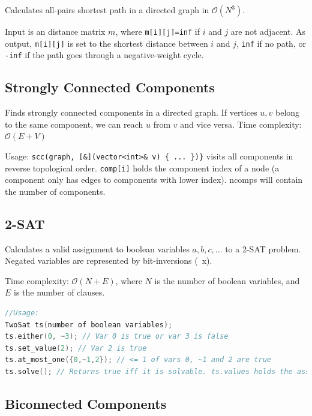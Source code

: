 \documentclass{article}
\begin{document}
Calculates all-pairs shortest path in a directed graph in $\mathcal{O}(N^3)$.

Input is an distance matrix $m$, where \lstinline{m[i][j]=inf} if $i$ and $j$ are not adjacent.
As output, \lstinline{m[i][j]} is set to the shortest distance between $i$ and $j$,
\lstinline{inf} if no path, or \lstinline{-inf} if the path goes through a negative-weight cycle.




\subsection*{Strongly Connected Components}

Finds strongly connected components in a directed graph. If vertices $u, v$ belong to the same component, we can reach $u$ from $v$ and vice versa.
Time complexity: $\mathcal{O}(E + V)$

Usage: \lstinline|scc(graph, [&](vector<int>& v) { ... })}| visits all components
in reverse topological order. \texttt{comp[i]} holds the component
index of a node (a component only has edges to components with
lower index). ncomps will contain the number of components.



\pagebreak

\subsection*{2-SAT}

Calculates a valid assignment to boolean variables $a, b, c,\ldots$ to a 2-SAT problem.
Negated variables are represented by bit-inversions (~x).

Time complexity: $\mathcal{O}(N+E)$, where $N$ is the number of boolean variables, and $E$ is the number of clauses.


\begin{lstlisting}[language=C++, aboveskip=0pt]
//Usage:
TwoSat ts(number of boolean variables);
ts.either(0, ~3); // Var 0 is true or var 3 is false
ts.set_value(2); // Var 2 is true
ts.at_most_one({0,~1,2}); // <= 1 of vars 0, ~1 and 2 are true
ts.solve(); // Returns true iff it is solvable. ts.values holds the assigned values to the variables
\end{lstlisting}


\subsection*{Biconnected Components}
\end{document}
